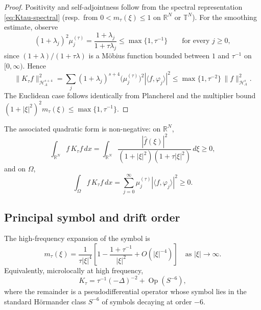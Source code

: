 \documentclass[11pt,reqno]{amsart}
\theoremstyle{definition}
\theoremstyle{remark}
\newcommand{\R}{\mathbb{R}}
\newcommand{\T}{\mathbb{T}}
\newcommand{\Hil}{\mathcal{H}}
\DeclareMathOperator{\Op}{Op}
\begin{document}
\begin{proof}
Positivity and self-adjointness follow from the spectral representation \eqref{eq:Ktau-spectral} (resp.\ from $0<m_\tau(\xi)\le 1$ on $\R^{N}$ or $\T^{N}$). For the smoothing estimate, observe
\[
        (1+\lambda_j)^{2}\mu_j^{(\tau)}
        =\frac{1+\lambda_j}{1+\tau\lambda_j}
        \le \max\{1,\tau^{-1}\}\qquad\text{for every }j\ge 0,
\]
since $(1+\lambda)/(1+\tau\lambda)$ is a Möbius function bounded between $1$ and $\tau^{-1}$ on $[0,\infty)$. Hence
\[
        \|K_\tau f\|_{\Hil_A^{s+4}}^{2}
        =\sum_{j}(1+\lambda_j)^{s+4}\bigl(\mu_j^{(\tau)}\bigr)^{2}|\langle f,\varphi_j\rangle|^{2}
        \le \max\{1,\tau^{-2}\}\,\|f\|_{\Hil_A^{s}}^{2}.
\]
The Euclidean case follows identically from Plancherel and the multiplier bound $(1+|\xi|^{2})^{2}m_\tau(\xi)\le\max\{1,\tau^{-1}\}$.
\end{proof}

The associated quadratic form is non-negative: on $\R^{N}$,
\begin{equation}\label{eq:Ktau-quadratic-Fourier}
        \int_{\R^{N}}f\,K_\tau f\,dx
        =\int_{\R^{N}}\frac{|\widehat f(\xi)|^{2}}{(1+|\xi|^{2})(1+\tau|\xi|^{2})}\,d\xi\ge 0,
\end{equation}
and on $\Omega$,
\begin{equation}\label{eq:Ktau-quadratic-spectral}
        \int_{\Omega}f\,K_\tau f\,dx
        =\sum_{j=0}^{\infty}\mu_j^{(\tau)}|\langle f,\varphi_j\rangle|^{2}\ge 0.
\end{equation}

\subsection{Principal symbol and drift order}
\label{subsec:principal-symbol}

The high-frequency expansion of the symbol is
\begin{equation}\label{eq:m-tau-expansion}
        m_\tau(\xi)
        =\frac{1}{\tau|\xi|^{4}}\left[1-\frac{1+\tau^{-1}}{|\xi|^{2}}+O(|\xi|^{-4})\right]
        \quad\text{as }|\xi|\to\infty.
\end{equation}
Equivalently, microlocally at high frequency,
\begin{equation}\label{eq:Ktau-principal-decomp}
        K_\tau=\tau^{-1}(-\Delta)^{-2}+\Op(S^{-6}),
\end{equation}
where the remainder is a pseudodifferential operator whose symbol lies in the standard Hörmander class $S^{-6}$ of symbols decaying at order $-6$.
\end{document}
